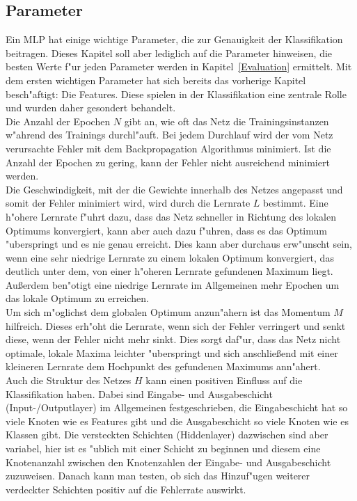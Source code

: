 \subsection{Parameter}
\label{Parameter}
Ein MLP hat einige wichtige Parameter, die zur Genauigkeit der Klassifikation beitragen. Dieses Kapitel soll aber lediglich auf die Parameter hinweisen, die besten Werte f"ur jeden Parameter werden in Kapitel~\ref{Evaluation} ermittelt. Mit dem ersten wichtigen Parameter hat sich bereits das vorherige Kapitel besch"aftigt: Die Features. Diese spielen in der Klassifikation eine zentrale Rolle und wurden daher gesondert behandelt.\\
Die Anzahl der Epochen $N$ gibt an, wie oft das Netz die Trainingsinstanzen w"ahrend des Trainings durchl"auft. Bei jedem Durchlauf wird der vom Netz verursachte Fehler mit dem Backpropagation Algorithmus minimiert. Ist die Anzahl der Epochen zu gering, kann der Fehler nicht ausreichend minimiert werden. \\ %
Die Geschwindigkeit, mit der die Gewichte innerhalb des Netzes angepasst und somit der Fehler minimiert wird, wird durch die Lernrate $L$ bestimmt. Eine h"ohere Lernrate f"uhrt dazu, dass das Netz schneller in Richtung des lokalen Optimums konvergiert, kann aber auch dazu f"uhren, dass es das Optimum "uberspringt und es nie genau erreicht. Dies kann aber durchaus erw"unscht sein, wenn eine sehr niedrige Lernrate zu einem lokalen Optimum konvergiert, das deutlich unter dem, von einer h"oheren Lernrate gefundenen Maximum liegt. Au{\ss}erdem ben"otigt eine niedrige Lernrate im Allgemeinen mehr Epochen um das lokale Optimum zu erreichen. \\
Um sich m"oglichst dem globalen Optimum anzun"ahern ist das Momentum $M$ hilfreich. Dieses erh"oht die Lernrate, wenn sich der Fehler verringert und senkt diese, wenn der Fehler nicht mehr sinkt. Dies sorgt daf"ur, dass das Netz nicht optimale, lokale Maxima leichter "uberspringt und sich anschlie{\ss}end mit einer kleineren Lernrate dem Hochpunkt des gefundenen Maximums ann"ahert.\\
Auch die Struktur des Netzes $H$ kann einen positiven Einfluss auf die Klassifikation haben. Dabei sind Eingabe- und Ausgabeschicht (Input-/Outputlayer) im Allgemeinen festgeschrieben, die Eingabeschicht hat so viele Knoten wie es Features gibt und die Ausgabeschicht so viele Knoten wie es Klassen gibt. Die versteckten Schichten (Hiddenlayer) dazwischen sind aber variabel, hier ist es "ublich mit einer Schicht zu beginnen und diesem eine Knotenanzahl zwischen den Knotenzahlen der Eingabe- und Ausgabeschicht zuzuweisen. Danach kann man testen, ob sich das Hinzuf"ugen weiterer verdeckter Schichten positiv auf die Fehlerrate auswirkt.\\ %
